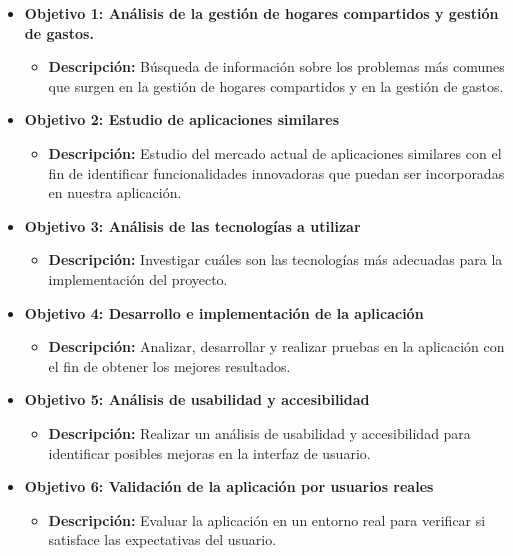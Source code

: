 \begin{itemize}
	\item\textbf{Objetivo 1: Análisis de la gestión de hogares compartidos y gestión de gastos.}
	\begin{itemize}
		\item \textbf{Descripción:} Búsqueda de información sobre los problemas más comunes que surgen en la gestión de hogares compartidos y en la gestión de gastos.
	\end{itemize} 

	\item \textbf{Objetivo 2: Estudio de aplicaciones similares}
	\begin{itemize}
		\item \textbf{Descripción:} Estudio del mercado actual de aplicaciones similares con el fin de identificar funcionalidades innovadoras que puedan ser incorporadas en nuestra aplicación.
	\end{itemize}

	\item \textbf{Objetivo 3: Análisis de las tecnologías a utilizar}
	\begin{itemize}
		\item \textbf{Descripción:} Investigar cuáles son las tecnologías más adecuadas para la implementación del proyecto.
	\end{itemize}
	
	\item \textbf{Objetivo 4: Desarrollo e implementación de la aplicación}
	\begin{itemize}
		\item \textbf{Descripción:} Analizar, desarrollar y realizar pruebas en la aplicación con el fin de obtener los mejores resultados.
	\end{itemize}
	\item \textbf{Objetivo 5: Análisis de usabilidad y accesibilidad}
    \begin{itemize}
        \item \textbf{Descripción:} Realizar un análisis de usabilidad y accesibilidad para identificar posibles mejoras en la interfaz de usuario.
    \end{itemize}
	\item \textbf{Objetivo 6: Validación de la aplicación por usuarios reales}
	\begin{itemize}
		\item \textbf{Descripción:} Evaluar la aplicación en un entorno real para verificar si satisface las expectativas del usuario.
	\end{itemize}
  
\end{itemize}

